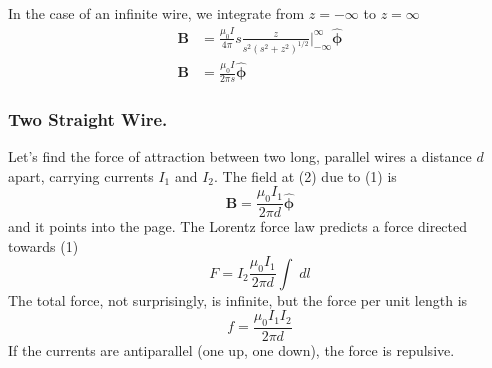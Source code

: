 \documentclass[../../../main.tex]{subfiles}
\begin{document}
In the case of an inﬁnite wire, we integrate from $z=-\infty$ to $z=\infty$
\begin{align*}
    \mathbf{B}&=\frac{\mu_0 I}{4\pi}s\frac{z}{s^2(s^2+z^2)^{1/2}}\bigg|_{- \infty}^{\infty}\boldsymbol{\hat{\phi}}\\
    \mathbf{B}&=\frac{\mu_0 I}{2\pi s}\boldsymbol{\hat{\phi}}
\end{align*}

\subsubsection{Two Straight Wire.}  Let’s ﬁnd the force of attraction between two long, parallel 
wires a distance $d$ apart, carrying currents $I_1$ and $I_2$. The ﬁeld at (2) due to (1) is
\begin{equation*}
    \mathbf{B}=\frac{\mu_0 I_1}{2\pi d}\boldsymbol{\hat{\phi}}
\end{equation*}
and it points into the page. The Lorentz force law predicts a force directed towards (1)
\begin{equation*}
    F=I_2\frac{\mu_0 I_1}{2\pi d}\int\;dl
\end{equation*}
The total force, not surprisingly, is inﬁnite, but the force per unit length is
\begin{equation*}
    f=\frac{\mu_0 I_1I_2}{2\pi d}
\end{equation*}
If the currents are antiparallel (one up, one down), the force is repulsive.
\begin{figure*}[ht]
    \centering
\end{figure*}
\end{document}
